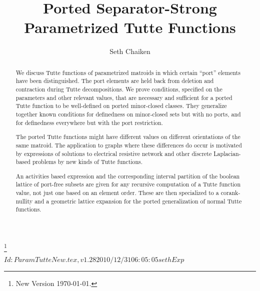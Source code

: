 \documentclass[12pt,leqno]{amsart}
\theoremstyle{remark}
\begin{document}
\title[Ported Separator-Strong Parametrized Tutte Functions]
{Ported Separator-Strong 
Parametrized Tutte Functions}

\author{Seth Chaiken}
\address{Computer Science Department\\
The University at Albany (SUNY)\\
Albany, NY 12222, U.S.A.}



\begin{abstract}
We discuss Tutte functions of parametrized matroids in which
certain ``port'' elements have been distinguished.
The port elements are held back from deletion and contraction
during Tutte decompositions.  We prove conditions, specified on the parameters
and other relevant values,
that are necessary and sufficient for a ported Tutte function to be well-defined
on ported minor-closed classes.
They generalize together known  
conditions for definedness on minor-closed sets but with no ports, and
for definedness everywhere but with the port restriction.  

The ported Tutte functions might have different values
on different orientations of the same matroid.
The 
application to graphs where these
differences do occur is motivated by
expressions of solutions to electrical resistive network
and other discrete Laplacian-based problems by new kinds of Tutte functions.

An activities based expression and the corresponding
interval partition of the boolean lattice of port-free subsets
are 
given for any recursive computation of a Tutte function value, 
not just one based on an element order.  These are then specialized to
a corank-nullity and a geometric lattice expansion for the ported
generalization of normal Tutte functions.
\end{abstract}





\thanks{New Version \today.}

\maketitle
\pagestyle{headings}

\RCSID $Id: ParamTutteNew.tex,v 1.28 2010/12/31 06:05:05 seth Exp $
\end{document}
